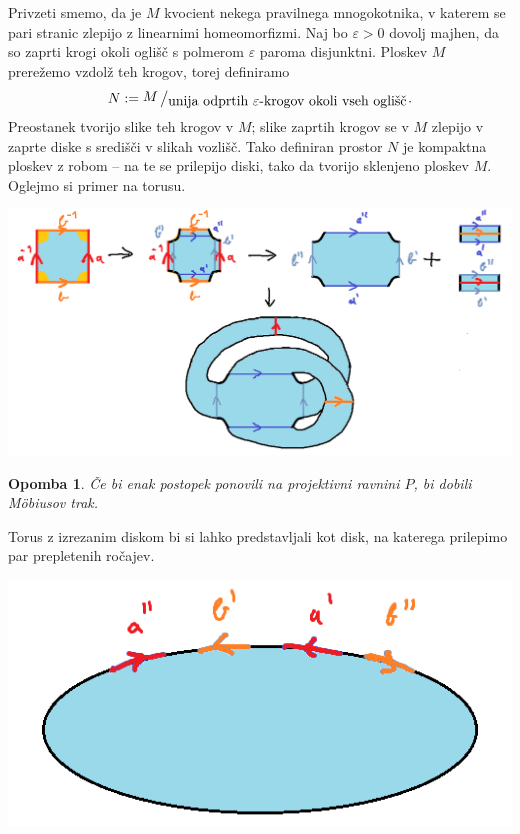 \documentclass[10pt, a4paper]{article}
\newtheorem*{opomba}{Opomba}
\newcommand{\quot}[2]{{\raisebox{0.1em}{$#1$}\left/\raisebox{-0.2em}{$#2$}\right.}}
\begin{document}
Privzeti smemo, da je $M$ kvocient nekega pravilnega mnogokotnika,
v katerem se pari stranic zlepijo z linearnimi homeomorfizmi.
Naj bo $\varepsilon > 0$ dovolj majhen, da so zaprti krogi 
okoli oglišč s polmerom $\varepsilon$ paroma disjunktni.
Ploskev $M$ prerežemo vzdolž teh krogov, torej definiramo 
$$N := \quot{M}{\textup{unija odprtih $\varepsilon$-krogov okoli vseh oglišč}}.$$
Preostanek tvorijo slike teh krogov v $M$; slike zaprtih krogov
se v $M$ zlepijo v zaprte diske s središči v slikah vozlišč.
Tako definiran prostor $N$ je kompaktna ploskev z robom -- na te se prilepijo 
diski, tako da tvorijo sklenjeno ploskev $M$. Oglejmo si primer na torusu.

\begin{center}
  \includegraphics[scale=0.8]{klasifikacija2.png}
\end{center}

\begin{opomba}
  Če bi enak postopek ponovili na projektivni ravnini $P$,
  bi dobili Möbiusov trak.
\end{opomba}

Torus z izrezanim diskom bi si lahko predstavljali kot disk, na katerega 
prilepimo par prepletenih ročajev.

\begin{center}
  \includegraphics[scale=0.6]{klasifikacija3.png}
\end{center}
\end{document}
